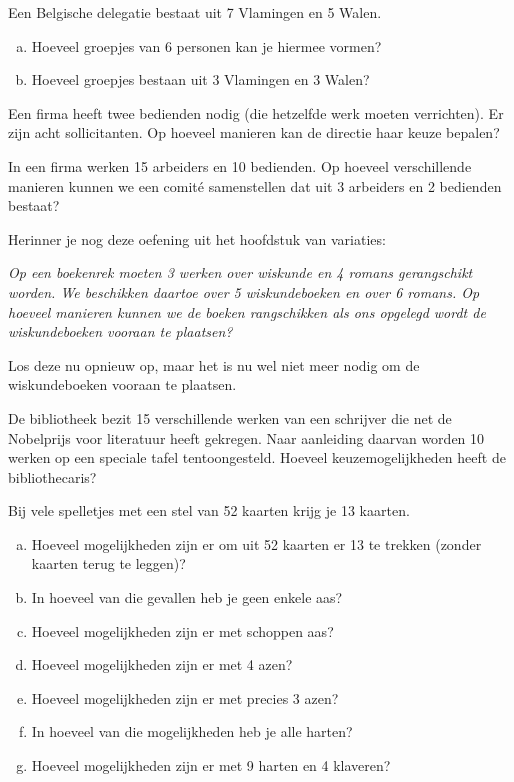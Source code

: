 \documentclass[12pt,twoside]{article}
\begin{document}
\begin{oefening}
Een Belgische delegatie bestaat uit 7 Vlamingen en 5 Walen.
\begin{enumerate}[(a)]
  \item Hoeveel groepjes van 6 personen kan je hiermee vormen?
  \item Hoeveel groepjes bestaan uit 3 Vlamingen en 3 Walen?
\end{enumerate}
\end{oefening}

\begin{oefening}
Een firma heeft twee bedienden nodig (die hetzelfde werk moeten verrichten). Er zijn acht sollicitanten. Op hoeveel manieren kan de directie haar keuze bepalen?
\end{oefening}

\begin{oefening}
In een firma werken 15 arbeiders en 10 bedienden. Op hoeveel verschillende manieren kunnen we een comité samenstellen dat uit 3 arbeiders en 2 bedienden bestaat?
\end{oefening}

\begin{oefening}
Herinner je nog deze oefening uit het hoofdstuk van variaties:

{\em Op een boekenrek moeten 3 werken over wiskunde en 4 romans gerangschikt worden. We beschikken daartoe over 5 wiskundeboeken en over 6 romans. Op hoeveel manieren kunnen we de boeken rangschikken als ons opgelegd wordt de wiskundeboeken vooraan te plaatsen?}

Los deze nu opnieuw op, maar het is nu wel niet meer nodig om de wiskundeboeken vooraan te plaatsen.
\end{oefening}

\begin{oefening}
De bibliotheek bezit 15 verschillende werken van een schrijver die net de Nobelprijs voor literatuur heeft gekregen. Naar aanleiding daarvan worden 10 werken op een speciale tafel tentoongesteld. Hoeveel keuzemogelijkheden heeft de bibliothecaris?
\end{oefening}

\begin{oefening}
Bij vele spelletjes met een stel van 52 kaarten krijg je 13 kaarten.
\begin{enumerate}[(a)]
  \item Hoeveel mogelijkheden zijn er om uit 52 kaarten er 13 te trekken (zonder kaarten terug te leggen)?
  \item In hoeveel van die gevallen heb je geen enkele aas?
  \item Hoeveel mogelijkheden zijn er met schoppen aas?
  \item Hoeveel mogelijkheden zijn er met 4 azen?
  \item Hoeveel mogelijkheden zijn er met precies 3 azen?
  \item In hoeveel van die mogelijkheden heb je alle harten?
  \item Hoeveel mogelijkheden zijn er met 9 harten en 4 klaveren?
\end{enumerate}
\end{oefening}
\end{document}

